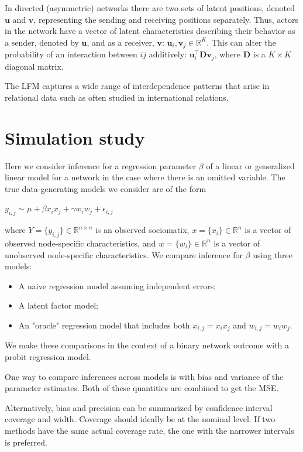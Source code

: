\documentclass[12pt]{amsart}
\begin{document}
In directed (asymmetric) networks there are two sets of latent positions, denoted $\textbf{u}$ and $\textbf{v}$, representing the sending and receiving positions separately.  Thus, actors in the network have a vector of latent characteristics describing their behavior as a sender, denoted by $\textbf{u}$, and as a receiver, $\textbf{v}$: $\textbf{u}_{i}, \textbf{v}_{j} \in \mathbb{R}^{K}$. This can alter the probability of an interaction between $ij$ additively: $\textbf{u}_{i}^{\top} \textbf{D} \textbf{v}_{j}$, where $\textbf{D}$ is a $K \times K$ diagonal matrix.

The LFM captures a wide range of interdependence patterns that arise in relational data such as often studied in international relations. 

\section{Simulation study}

Here we consider inference for a regression parameter $\beta$ of a linear or generalized linear model for a network in the case where there is an omitted variable. The true data-generating models we consider are of the form 

$y_{i,j} \sim  \mu + \beta x_i x_j + \gamma w_i w_j + \epsilon_{i,j} $

where $Y= \{y_{i,j}\}\in \mathbb R^{n\times n}$ is an observed sociomatix, $x = \{x_i \} \in \mathbb R^n$ is a vector of observed node-specific characteristics, and $w = \{ w_i\} \in \mathbb R^n$ is a vector of unobserved node-specific characteristics. We compare inference for $\beta$ using three models:

\begin{itemize}
	\item A naive regression model assuming independent errors; 
	\item A latent factor model; 
	\item An "oracle" regression model that includes both $x_{i,j}=x_i x_j$ and $w_{i,j}=w_i w_j$. 
\end{itemize}

We make these comparisons in the context of a binary network outcome with a probit regression model. 

One way to compare inferences across models is  with bias and variance of the parameter estimates. Both of these quantities are combined to get the MSE. 

Alternatively, bias and precision can be summarized by confidence interval coverage and width. Coverage should ideally be at the nominal level. If two methods have the same actual coverage rate, the one with the narrower intervals is preferred. 
\end{document}
